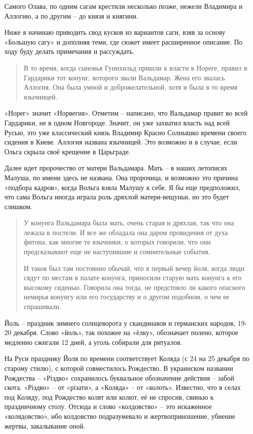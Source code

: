 Самого Олава, по одним сагам крестили несколько позже, нежели Владимира и Аллогию, а по другим – до князя и княгини.

Ниже я начинаю приводить свод кусков из вариантов саги, взяв за основу «Большую сагу» и дополняя теми, где сюжет имеет расширенное описание. По ходу буду делать примечания и рассуждать.

\begin{quotation}
В то время, когда сыновья Гуннхильд пришли к власти в Нореге, правил в Гардарики тот конунг, которого звали Вальдамар. Жена его звалась Аллогия. Она была умной и доброжелательной, хотя и была в то время язычницей.
\end{quotation}

«Норег» значит «Норвегия». Отметим – написано, что Вальдамар правит во всей Гардарики, не в одном Новгороде. Значит, он уже захватил власть над всей Русью, это уже классический князь Владимир Красно Солнышко времени своего сидения в Киеве. Аллогия названа язычницей. Это возможно и в случае, если Ольга скрыла своё крещение в Царьграде.

Далее идет пророчество от матери Вальдамара. Мать – в наших летописях Малуша, по имени здесь не названа. Она пророчица, и возможно это причина «подбора кадров», когда Вольга взяла Малушу к себе. Я бы еще предположил, что сама Вольга иногда играла роль дряхлой матери-вещуньи, но это будет слишком.

\begin{quotation}
У конунга Вальдамара была мать, очень старая и дряхлая, так что она лежала в постели. И все же обладала она даром провидения от духа фитона, как многие те язычники, о которых говорили, что они предсказывают еще не наступившие и сомнительные события.

И таков был там постоянно обычай, что в первый вечер йоля, когда люди сядут по местам в палате конунга, приносили старую мать конунга к его высокому сиденью. Говорила она тогда, не предстояло ли какого опасного немирья конунгу или его государству и о другом подобном, о чем ее спрашивали. 
\end{quotation}

Йоль – праздник зимнего солнцеворота у скандинавов и германских народов, 19-20 декабря. Слово «йоль», так похожее на «ёлку», обозначает полено, которое медленно сжигали 12 дней, а уголь собирали для ритуалов.

На Руси празднику Йоля по времени соответствует Коляда (с 24 на 25 декабря по старому стилю), с которой совместилось Рождество. В украинском названии Рождества – «Різдво» сохранилось буквальное обозначение действия – забой скота. «Різдво» – от «різати», а «Коляда» – от «колоть». Известно, что в селах под Коляду, под Рождество колят или колют, её не спросив, свинью к праздничному столу. Отсюда и слово «колдовство» – это искаженное «колядовство», ибо колдовство подразумевало и жертвоприношение, убиение жертвы, закалывание оной.

